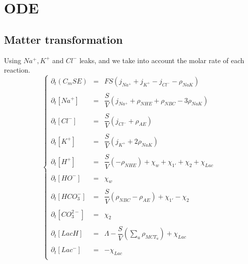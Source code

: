 \documentclass{revtex4}
\begin{document}
\section{ODE}
\subsection{Matter transformation}
Using $Na^+,K^+$ and $Cl^-$ leaks, and we take into account the molar rate of each reaction.	
\begin{equation}
\left\lbrace
\begin{array}{rcl}
	\partial_t \left(C_m S E \right) & = & FS\left(j_{Na^+}+j_{K^+}-j_{Cl^-} - \rho_{NaK}\right) \\
	\\
	\partial_t \left[Na^+\right] & = & \dfrac{S}{V}\left(j_{Na^+}+\rho_{NHE}+\rho_{NBC}-3\rho_{NaK}\right) \\
	\\
	\partial_t \left[Cl^-\right] & = & \dfrac{S}{V}\left(j_{Cl^-} + \rho_{AE}\right)\\
	\\
	\partial_t \left[K^+\right]  & = & \dfrac{S}{V}\left(j_{K^+}+2\rho_{NaK}\right)\\
	\\
	\partial_t \left[H^+\right]  & = & \dfrac{S}{V}\left(-\rho_{NHE}\right) + \chi_{w} + \chi_{1'} + \chi_2 + \chi_{Lac}\\
	\\
	\partial_t \left[HO^-\right] & = & \chi_{w}\\
	\\
	\partial_t \left[HCO_3^-\right] & = & \dfrac{S}{V}\left(\rho_{NBC}-\rho_{AE}\right) + \chi_{1'} - \chi_2 \\
	\\
	\partial_t \left[CO_3^{2-}\right] & = & \chi_2\\
	\\
	\partial_t \left[LacH\right]      & = & \Lambda - \dfrac{S}{V}\left(\sum_u\rho_{MCT_u}\right) + \chi_{Lac}\\
	\\
	\partial_t \left[Lac^-\right]     & = & - \chi_{Lac}\\
	
\end{array}
\right.
\end{equation}
\end{document}
